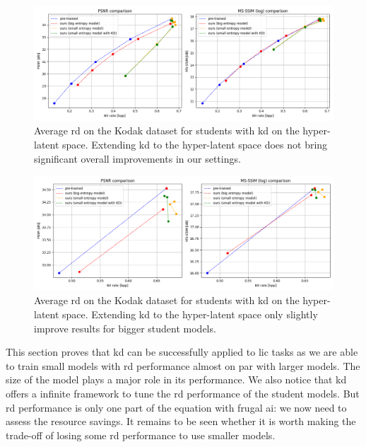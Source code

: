 \documentclass{article}
\begin{document}
\begin{figure}
    \centering
    \includegraphics[width=15cm]{kd_lic_hyper_rd_channels_1.png}
    \caption[Average \acrshort{rd} on the Kodak dataset for students with \acrshort{kd} on the hyper-latent space.]{Average \acrshort{rd} on the Kodak dataset for students with \acrshort{kd} on the hyper-latent space. Extending \acrshort{kd} to the hyper-latent space does not bring significant overall improvements in our settings.}
    \label{kd_lic_6}
\end{figure}

\begin{figure}
    \centering
    \includegraphics[width=15cm]{kd_lic_hyper_rd_channels_2.png}
    \caption[Average \acrshort{rd} on the Kodak dataset for students with \acrshort{kd} on the hyper-latent space (zoom).]{Average \acrshort{rd} on the Kodak dataset for students with \acrshort{kd} on the hyper-latent space. Extending \acrshort{kd} to the hyper-latent space only slightly improve results for bigger student models.}
    \label{kd_lic_7}
\end{figure}

This section proves that \acrshort{kd} can be successfully applied to \acrshort{lic} tasks as we are able to train small models with \acrshort{rd} performance almost on par with larger models. The size of the model plays a major role in its performance. We also notice that \acrshort{kd} offers a infinite framework to tune the \acrshort{rd} performance of the student models. But \acrshort{rd} performance is only one part of the equation with frugal \acrshort{ai}: we now need to assess the resource savings. It remains to be seen whether it is worth making the trade-off of losing some \acrshort{rd} performance to use smaller models.
\end{document}
